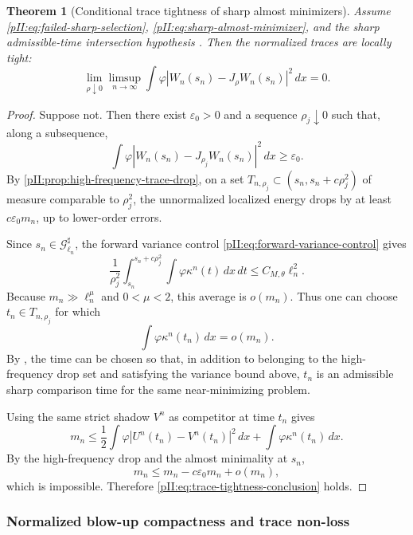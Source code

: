 \documentclass[11pt]{article}
\numberwithin{equation}{section}
\theoremstyle{plain}
\newtheorem{theorem}{Theorem}[section]
\theoremstyle{definition}
\theoremstyle{remark}
\newcommand{\dx}{\,dx}
\newcommand{\dt}{\,dt}
\begin{document}
\begin{theorem}[Conditional trace tightness of sharp almost minimizers]\label{pII:thm:trace-tightness-sharp}
Assume \eqref{pII:eq:failed-sharp-selection}, \eqref{pII:eq:sharp-almost-minimizer}, and the sharp admissible-time intersection hypothesis .  Then the normalized traces are locally tight:
\begin{equation}\label{pII:eq:trace-tightness-conclusion}
        \lim_{\rho\downarrow0}\limsup_{n\to\infty}
        \int\varphi |W_n(s_n)-J_\rho W_n(s_n)|^2\dx=0.
\end{equation}
\end{theorem}

\begin{proof}
Suppose not.  Then there exist $\varepsilon_0>0$ and a sequence $\rho_j\downarrow0$ such that, along a subsequence,
\[
        \int\varphi |W_n(s_n)-J_{\rho_j}W_n(s_n)|^2\dx\ge\varepsilon_0.
\]
By \cref{pII:prop:high-frequency-trace-drop}, on a set $T_{n,\rho_j}\subset(s_n,s_n+c\rho_j^2)$ of measure comparable to $\rho_j^2$, the unnormalized localized energy drops by at least $c\varepsilon_0m_n$, up to lower-order errors.

Since $s_n\in\mathcal G^\sharp_{\ell_n}$, the forward variance control \eqref{pII:eq:forward-variance-control} gives
\[
        \frac1{\rho_j^2}\int_{s_n}^{s_n+c\rho_j^2}
        \int\varphi\kappa^n(t)\dx\dt
        \le C_{M,\theta}\ell_n^2.
\]
Because $m_n\gg\ell_n^\mu$ and $0<\mu<2$, this average is $o(m_n)$.  Thus one can choose $t_n\in T_{n,\rho_j}$ for which
\[
        \int\varphi\kappa^n(t_n)\dx=o(m_n).
\]
By , the time can be chosen so that, in addition to belonging to the high-frequency drop set and satisfying the variance bound above, $t_n$ is an admissible sharp comparison time for the same near-minimizing problem.

Using the same strict shadow $V^n$ as competitor at time $t_n$ gives
\[
        m_n
        \le \frac12\int\varphi|U^n(t_n)-V^n(t_n)|^2\dx
        +\int\varphi\kappa^n(t_n)\dx.
\]
By the high-frequency drop and the almost minimality at $s_n$,
\[
        m_n\le m_n-c\varepsilon_0m_n+o(m_n),
\]
which is impossible.  Therefore \eqref{pII:eq:trace-tightness-conclusion} holds.
\end{proof}

\subsubsection{Normalized blow-up compactness and trace non-loss}
\end{document}
